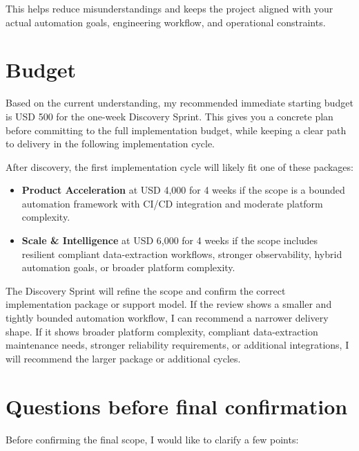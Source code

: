 \documentclass[11pt,a4paper]{article}
\begin{document}
This helps reduce misunderstandings and keeps the project aligned with your actual automation goals, engineering workflow, and operational constraints.\par

\section*{Budget}

Based on the current understanding, my recommended immediate starting budget is USD 500 for the one-week Discovery Sprint. This gives you a concrete plan before committing to the full implementation budget, while keeping a clear path to delivery in the following implementation cycle.\par

After discovery, the first implementation cycle will likely fit one of these packages:\par

\begin{itemize}
\item \textbf{Product Acceleration} at USD 4,000 for 4 weeks if the scope is a bounded automation framework with CI/CD integration and moderate platform complexity.
\item \textbf{Scale \& Intelligence} at USD 6,000 for 4 weeks if the scope includes resilient compliant data-extraction workflows, stronger observability, hybrid automation goals, or broader platform complexity.
\end{itemize}

The Discovery Sprint will refine the scope and confirm the correct implementation package or support model. If the review shows a smaller and tightly bounded automation workflow, I can recommend a narrower delivery shape. If it shows broader platform complexity, compliant data-extraction maintenance needs, stronger reliability requirements, or additional integrations, I will recommend the larger package or additional cycles.\par

\section*{Questions before final confirmation}

Before confirming the final scope, I would like to clarify a few points:\par
\end{document}
